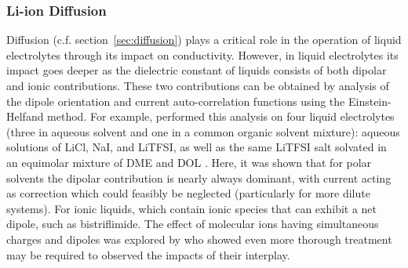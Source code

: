 \documentclass[../main.tex]{subfiles}
\begin{document}
\subsubsection{Li-ion Diffusion}
Diffusion (c.f. section~\ref{sec:diffusion}) plays a critical role in the operation of liquid electrolytes through its impact on conductivity. However, in liquid electrolytes its impact goes deeper as the dielectric constant of liquids consists of both dipolar and ionic contributions. These two contributions can be obtained by analysis of the dipole orientation and current auto-correlation functions using the Einstein-Helfand method. For example, \citeauthor{coles_correlation_2020} performed this analysis on four liquid electrolytes (three in aqueous solvent and one in a common organic solvent mixture): aqueous solutions of LiCl, NaI, and LiTFSI, as well as the same LiTFSI salt solvated in an equimolar mixture of DME and DOL \cite{coles_correlation_2020}. Here, it was shown that for polar solvents the dipolar contribution is nearly always dominant, with current acting as correction which could feasibly be neglected (particularly for more dilute systems). For ionic liquids, which contain ionic species that can exhibit a net dipole, such as bistriflimide. The effect of molecular ions having simultaneous charges and dipoles was explored by \citeauthor{schroder_collective_2011} who showed even more thorough treatment may be required to observed the impacts of their interplay\cite{schroder_dielectric_2009}.
\end{document}
